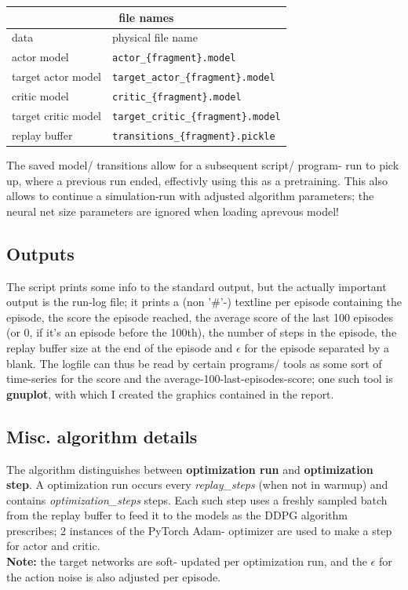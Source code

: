 \documentclass[a4paper]{article}
\begin{document}
\small
\begin{tabular}{ |l|l| }
  \hline
  \multicolumn{2}{|c|}{file names} \\
  \hline
data & physical file name \\
  \hline
actor model & \texttt{actor\_\{fragment\}.model} \\
target actor model & \texttt{target\_actor\_\{fragment\}.model} \\
critic model & \texttt{critic\_\{fragment\}.model} \\
target critic model & \texttt{target\_critic\_\{fragment\}.model} \\
replay buffer & \texttt{transitions\_\{fragment\}.pickle} \\
  \hline
\end{tabular}
\normalsize

The saved model/ transitions allow for a subsequent script/ program- run to
pick up, where a previous run ended, effectivly using this as a pretraining.
This also allows to continue a simulation-run with adjusted algorithm parameters;
the neural net size parameters are ignored when loading aprevous model!

\subsection{Outputs}

The script prints some info to the standard output, but the actually important
output is the run-log file; it prints a (non '\#'-) textline per episode containing
the episode, the score the episode reached, the average score of the last 100
episodes (or 0, if it's an episode before the 100th), the number of steps
in the episode, the replay buffer size at the end of the episode and $\epsilon$ for the episode
separated by a blank.
The logfile can thus be read by certain programs/ tools as some sort
of time-series for the score and the average-100-last-episodes-score; one such
tool is \textbf{gnuplot}, with which I created the graphics contained in the report.

\subsection{Misc. algorithm details}
The algorithm distinguishes between \textbf{optimization run} and \textbf{optimization step}.
A optimization run occurs every \textit{replay\_steps} (when not in warmup) and
contains \textit{optimization\_steps} steps. Each such step uses a freshly sampled
batch from the replay buffer to feed it to the models as the DDPG algorithm
prescribes; 2 instances of the PyTorch Adam- optimizer are used to make a step
for actor and critic.
\\
\textbf{Note:} the target networks are soft- updated per optimization run,
and the $\epsilon$ for the action noise is also adjusted per episode.
\end{document}
